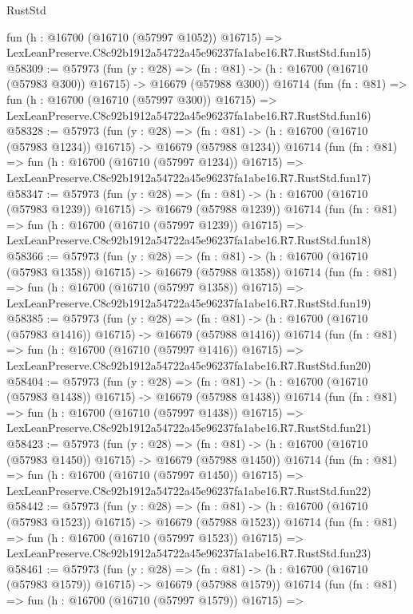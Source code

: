 \begin{lexlean}{RustStd}
\begin{coremodule}
    fun (h : @16700 (@16710 (@57997 @1052)) @16715) =>
    LexLeanPreserve.C8c92b1912a54722a45e96237fa1abe16.R7.RustStd.fun15)
@58309 := @57973
    (fun (y : @28) =>
    (fn : @81) -> (h : @16700 (@16710 (@57983 @300)) @16715) -> @16679 (@57988 @300))
    @16714
    (fun (fn : @81) =>
    fun (h : @16700 (@16710 (@57997 @300)) @16715) =>
    LexLeanPreserve.C8c92b1912a54722a45e96237fa1abe16.R7.RustStd.fun16)
@58328 := @57973
    (fun (y : @28) =>
    (fn : @81) -> (h : @16700 (@16710 (@57983 @1234)) @16715) -> @16679 (@57988 @1234))
    @16714
    (fun (fn : @81) =>
    fun (h : @16700 (@16710 (@57997 @1234)) @16715) =>
    LexLeanPreserve.C8c92b1912a54722a45e96237fa1abe16.R7.RustStd.fun17)
@58347 := @57973
    (fun (y : @28) =>
    (fn : @81) -> (h : @16700 (@16710 (@57983 @1239)) @16715) -> @16679 (@57988 @1239))
    @16714
    (fun (fn : @81) =>
    fun (h : @16700 (@16710 (@57997 @1239)) @16715) =>
    LexLeanPreserve.C8c92b1912a54722a45e96237fa1abe16.R7.RustStd.fun18)
@58366 := @57973
    (fun (y : @28) =>
    (fn : @81) -> (h : @16700 (@16710 (@57983 @1358)) @16715) -> @16679 (@57988 @1358))
    @16714
    (fun (fn : @81) =>
    fun (h : @16700 (@16710 (@57997 @1358)) @16715) =>
    LexLeanPreserve.C8c92b1912a54722a45e96237fa1abe16.R7.RustStd.fun19)
@58385 := @57973
    (fun (y : @28) =>
    (fn : @81) -> (h : @16700 (@16710 (@57983 @1416)) @16715) -> @16679 (@57988 @1416))
    @16714
    (fun (fn : @81) =>
    fun (h : @16700 (@16710 (@57997 @1416)) @16715) =>
    LexLeanPreserve.C8c92b1912a54722a45e96237fa1abe16.R7.RustStd.fun20)
@58404 := @57973
    (fun (y : @28) =>
    (fn : @81) -> (h : @16700 (@16710 (@57983 @1438)) @16715) -> @16679 (@57988 @1438))
    @16714
    (fun (fn : @81) =>
    fun (h : @16700 (@16710 (@57997 @1438)) @16715) =>
    LexLeanPreserve.C8c92b1912a54722a45e96237fa1abe16.R7.RustStd.fun21)
@58423 := @57973
    (fun (y : @28) =>
    (fn : @81) -> (h : @16700 (@16710 (@57983 @1450)) @16715) -> @16679 (@57988 @1450))
    @16714
    (fun (fn : @81) =>
    fun (h : @16700 (@16710 (@57997 @1450)) @16715) =>
    LexLeanPreserve.C8c92b1912a54722a45e96237fa1abe16.R7.RustStd.fun22)
@58442 := @57973
    (fun (y : @28) =>
    (fn : @81) -> (h : @16700 (@16710 (@57983 @1523)) @16715) -> @16679 (@57988 @1523))
    @16714
    (fun (fn : @81) =>
    fun (h : @16700 (@16710 (@57997 @1523)) @16715) =>
    LexLeanPreserve.C8c92b1912a54722a45e96237fa1abe16.R7.RustStd.fun23)
@58461 := @57973
    (fun (y : @28) =>
    (fn : @81) -> (h : @16700 (@16710 (@57983 @1579)) @16715) -> @16679 (@57988 @1579))
    @16714
    (fun (fn : @81) =>
    fun (h : @16700 (@16710 (@57997 @1579)) @16715) =>

\end{coremodule}
\end{lexlean}
